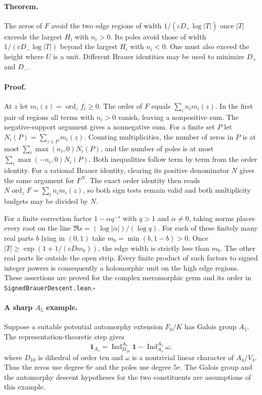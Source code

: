 \documentclass[11pt]{article}
\begin{document}
\paragraph{Theorem.}
The zeros of $F$ avoid the two edge regions of width $1/(cD_+\log|T|)$ once $|T|$ exceeds the largest $H_i$ with $n_i>0$. Its poles avoid those of width $1/(cD_-\log|T|)$ beyond the largest $H_i$ with $n_i<0$. One must also exceed the height where $U$ is a unit. Different Brauer identities may be used to minimize $D_+$ and $D_-$.

\paragraph{Proof.}
At $z$ let $m_i(z)=\operatorname{ord}_z f_i\ge0$. The order of $F$ equals $\sum_i n_i m_i(z)$. In the first pair of regions all terms with $n_i>0$ vanish, leaving a nonpositive sum. The negative-support argument gives a nonnegative sum. For a finite set $P$ let $N_i(P)=\sum_{z\in P}m_i(z)$. Counting multiplicities, the number of zeros in $P$ is at most $\sum_i\max(n_i,0)N_i(P)$, and the number of poles is at most $\sum_i\max(-n_i,0)N_i(P)$. Both inequalities follow term by term from the order identity. For a rational Brauer identity, clearing its positive denominator $N$ gives the same argument for $F^N$. The exact order identity then reads $N\operatorname{ord}_z F=\sum_i n_i m_i(z)$, so both sign tests remain valid and both multiplicity budgets may be divided by $N$.

For a finite correction factor $1-\alpha q^{-s}$ with $q>1$ and $\alpha\ne0$, taking norms places every root on the line $\Re s=(\log|\alpha|)/(\log q)$. For each of these finitely many real parts $b$ lying in $(0,1)$ take $m_b=\min(b,1-b)>0$. Once $|T|\ge\exp(1+1/(cD m_b))$, the edge width is strictly less than $m_b$. The other real parts lie outside the open strip. Every finite product of such factors to signed integer powers is consequently a holomorphic unit on the high edge regions. These assertions are proved for the complex meromorphic germ and its order in \texttt{SignedBrauerDescent.lean}.\hfill$\square$

\paragraph{A sharp $A_5$ example.}
Suppose a suitable potential automorphy extension $F_0/K$ has Galois group $A_5$. The representation-theoretic step gives
\[
 \mathbf1_{A_5}=\operatorname{Ind}_{D_{10}}^{A_5}\mathbf1
              -\operatorname{Ind}_{A_4}^{A_5}\omega,
\]
where $D_{10}$ is dihedral of order ten and $\omega$ is a nontrivial linear character of $A_4/V_4$. Thus the zeros use degree $6r$ and the poles use degree $5r$. The Galois group and the automorphy descent hypotheses for the two constituents are assumptions of this example.
\end{document}
